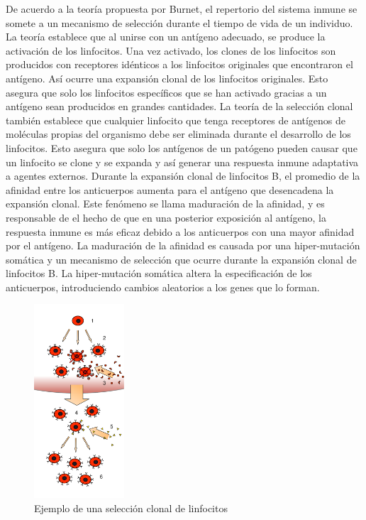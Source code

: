 De acuerdo a la teoría propuesta por Burnet, el repertorio del sistema inmune se somete a un mecanismo de selección durante el tiempo de vida de un individuo.
La teoría establece que al unirse con un antígeno adecuado, se produce la activación de los linfocitos.
Una vez activado, los clones de los linfocitos son producidos con receptores idénticos a los linfocitos originales que encontraron el antígeno.
Así ocurre una expansión clonal de los linfocitos originales.
Esto asegura que solo los linfocitos específicos que se han activado gracias a un antígeno sean producidos en grandes cantidades.
La teoría de la selección clonal también establece que cualquier linfocito que tenga receptores de antígenos de moléculas propias del organismo
debe ser eliminada durante el desarrollo de los linfocitos.
Esto asegura que solo los antígenos de un patógeno pueden causar que un linfocito se clone y se expanda y así generar una respuesta inmune adaptativa a
agentes externos.
Durante la expansión clonal de linfocitos B, el promedio de la afinidad entre los anticuerpos aumenta para el antígeno que desencadena la expansión clonal.
Este fenómeno se llama maduración de la afinidad, y es responsable de el hecho de que en una posterior exposición al antígeno, la respuesta inmune es más eficaz debido a los anticuerpos con una mayor afinidad por el antígeno.
La maduración de la afinidad es causada por una hiper-mutación somática y un mecanismo de selección que ocurre durante la expansión clonal de linfocitos B.
La hiper-mutación somática altera la especificación de los anticuerpos, introduciendo cambios aleatorios a los genes que lo forman.
\begin{figure}[h!]
\begin{center}
\includegraphics[width=0.3\textwidth]{img/clonalSelection.pdf}
\end{center}
\caption{Ejemplo de una selección clonal de linfocitos}
\label{fig:clonalSelection}
\end{figure}

